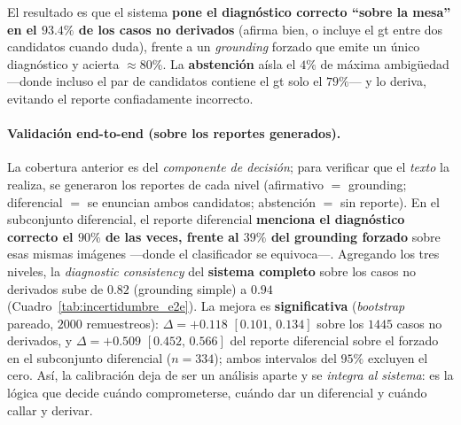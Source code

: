 \documentclass[11pt, a4paper]{article}
\begin{document}
El resultado es que el sistema \textbf{pone el diagnóstico correcto ``sobre la mesa'' en el $93.4\%$ de los
casos no derivados} (afirma bien, o incluye el gt entre dos candidatos cuando duda), frente a un
\emph{grounding} forzado que emite un único diagnóstico y acierta $\approx$80\%. La \textbf{abstención}
aísla el $4\%$ de máxima ambigüedad —donde incluso el par de candidatos contiene el gt solo el $79\%$— y lo
deriva, evitando el reporte confiadamente incorrecto.

\paragraph{Validación end-to-end (sobre los reportes generados).} La cobertura anterior es del
\emph{componente de decisión}; para verificar que el \emph{texto} la realiza, se generaron los reportes de
cada nivel (afirmativo $=$ grounding; diferencial $=$ se enuncian ambos candidatos; abstención $=$ sin
reporte). En el subconjunto diferencial, el reporte diferencial \textbf{menciona el diagnóstico correcto el
$90\%$ de las veces, frente al $39\%$ del grounding forzado} sobre esas mismas imágenes —donde el
clasificador se equivoca—. Agregando los tres niveles, la \emph{diagnostic consistency} del \textbf{sistema
completo} sobre los casos no derivados sube de $\mathbf{0.82}$ (grounding simple) a $\mathbf{0.94}$
(Cuadro~\ref{tab:incertidumbre_e2e}). La mejora es \textbf{significativa} (\emph{bootstrap} pareado,
$2000$ remuestreos): $\Delta=+0.118$ $[0.101,\,0.134]$ sobre los $1445$ casos no derivados, y
$\Delta=+0.509$ $[0.452,\,0.566]$ del reporte diferencial sobre el forzado en el subconjunto diferencial
($n=334$); ambos intervalos del $95\%$ excluyen el cero. Así, la calibración deja de ser un análisis aparte y se
\emph{integra al sistema}: es la lógica que decide cuándo comprometerse, cuándo dar un diferencial y cuándo
callar y derivar.
\end{document}
